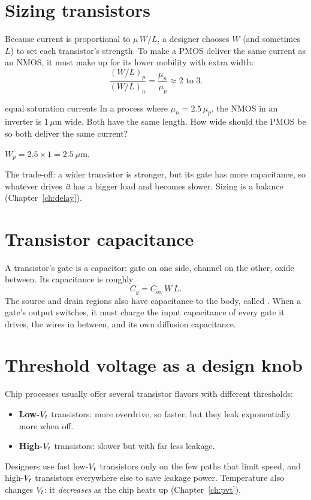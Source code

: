\section{Sizing transistors}
\label{sec:sizing}

Because current is proportional to $\mu\,W/L$, a designer chooses $W$ (and sometimes $L$) to set each transistor's strength. To make a PMOS deliver the same current as an NMOS, it must make up for its lower mobility with extra width:
\[
  \frac{(W/L)_p}{(W/L)_n} = \frac{\mu_n}{\mu_p} \approx 2 \text{ to } 3.
\]

\begin{worked}{equal saturation currents}
In a process where $\mu_n = 2.5\,\mu_p$, the NMOS in an inverter is 1\,$\mu$m wide. Both have the same length. How wide should the PMOS be so both deliver the same current?

$W_p = 2.5 \times 1 = 2.5~\mu$m.
\end{worked}

The trade-off: a wider transistor is stronger, but its gate has more capacitance, so whatever drives \emph{it} has a bigger load and becomes slower. Sizing is a balance (Chapter~\ref{ch:delay}).

\section{Transistor capacitance}

A transistor's gate is a capacitor: gate on one side, channel on the other, oxide between. Its capacitance is roughly
\[
  C_g = C_{ox}\,W\,L.
\]
The source and drain regions also have capacitance to the body, called . When a gate's output switches, it must charge the input capacitance of every gate it drives, the wires in between, and its own diffusion capacitance.

\section{Threshold voltage as a design knob}

Chip processes usually offer several transistor flavors with different thresholds:
\begin{itemize}
  \item \textbf{Low-$V_{t}$} transistors: more overdrive, so faster, but they leak exponentially more when off.
  \item \textbf{High-$V_{t}$} transistors: slower but with far less leakage.
\end{itemize}
Designers use fast low-$V_{t}$ transistors only on the few paths that limit speed, and high-$V_{t}$ transistors everywhere else to save leakage power. Temperature also changes $V_{t}$: it \emph{decreases} as the chip heats up (Chapter~\ref{ch:pvt}).

